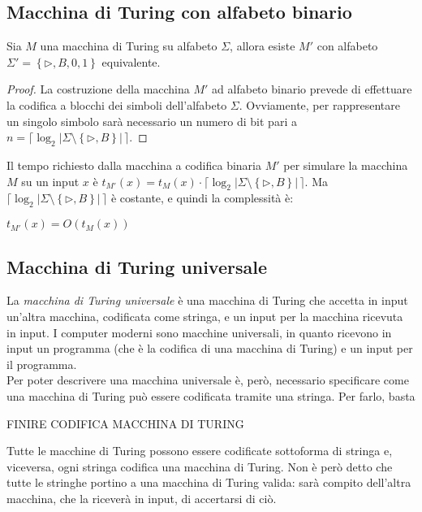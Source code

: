 \subsection*{Macchina di Turing con alfabeto binario}
\begin{thm}
    Sia $M$ una macchina di Turing su alfabeto $\Sigma$, allora esiste $M'$ con alfabeto $\Sigma' = \left\{ \triangleright, B, 0, 1 \right\}$ equivalente.
\end{thm}
\begin{proof}
    La costruzione della macchina $M'$ ad alfabeto binario prevede di effettuare la codifica a blocchi dei simboli dell'alfabeto $\Sigma$.
    Ovviamente, per rappresentare un singolo simbolo sarà necessario un numero di bit pari a $n = \lceil \log_2 |\Sigma \setminus \left\{ \triangleright, B \right\}| \, \rceil$.
\end{proof}
\begin{rem}
    Il tempo richiesto dalla macchina a codifica binaria $M'$ per simulare la macchina $M$ su un input $x$ è $t_{M'}(x) = t_M(x) \cdot \lceil \log_2 |\Sigma \setminus \left\{ \triangleright, B \right\}| \, \rceil$. Ma $\lceil \log_2 |\Sigma \setminus \left\{ \triangleright, B \right\}| \, \rceil$ è costante, e quindi la complessità è:
    \begin{center}
        $t_{M'}(x) = O(t_M(x))$
    \end{center}
\end{rem}

\subsection*{Macchina di Turing universale}
La \textit{macchina di Turing universale} è una macchina di Turing che accetta in input un'altra macchina, codificata come stringa, e un input per la macchina ricevuta in input.
I computer moderni sono macchine universali, in quanto ricevono in input un programma (che è la codifica di una macchina di Turing) e un input per il programma.\\
Per poter descrivere una macchina universale è, però, necessario specificare come una macchina di Turing può essere codificata tramite una stringa. Per farlo, basta

FINIRE CODIFICA MACCHINA DI TURING

Tutte le macchine di Turing possono essere codificate sottoforma di stringa e, viceversa, ogni stringa codifica una macchina di Turing.
Non è però detto che tutte le stringhe portino a una macchina di Turing valida: sarà compito dell'altra macchina, che la riceverà in input, di accertarsi di ciò.

